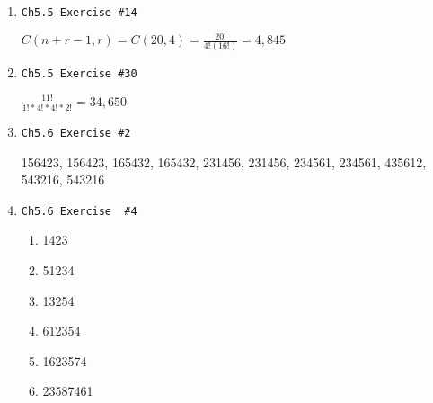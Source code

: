 \documentclass[11pt]{article}
\begin{document}
\begin{enumerate}
    \item \begin{verbatim}Ch5.5 Exercise #14\end{verbatim}
        $ C(n+r-1, r) = C(20, 4) = \frac{20!}{4!(16!)} = 4,845$
    \item \begin{verbatim}Ch5.5 Exercise #30\end{verbatim}
        $ \frac{11!}{1! * 4! * 4! * 2!} = 34,650$
    \item \begin{verbatim}Ch5.6 Exercise #2\end{verbatim}
        156423, 156423, 165432, 165432, 231456, 231456, 234561, 234561, 435612, 543216, 543216
    \item \begin{verbatim}Ch5.6 Exercise  #4\end{verbatim}
        \begin{enumerate}
            \item 1423
            \item 51234
            \item 13254
            \item 612354
            \item 1623574
            \item 23587461
        \end{enumerate}

\end{enumerate}
\end{document}
